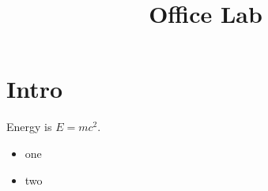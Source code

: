 \documentclass{article}
\title{Office Lab}
\begin{document}
\maketitle
\section{Intro}
Energy is $E=mc^2$.
\begin{itemize}\item one\item two\end{itemize}
\end{document}
